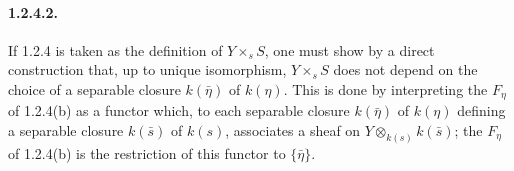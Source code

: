 \paragraph{1.2.4.2.}
If 1.2.4 is taken as the definition of $Y\times_sS$, one must show by
a direct construction that, up to unique isomorphism, $Y\times_sS$
does not depend on the choice of a separable closure $k(\bar\eta)$ of
$k(\eta)$.  This is done by interpreting the $F_\eta$ of 1.2.4(b) as
a functor which, to each separable closure $k(\bar\eta)$ of $k(\eta)$
defining a separable closure $k(\bar s)$ of $k(s)$, associates a sheaf
on $Y\otimes_{k(s)}k(\bar s)$; the $F_\eta$ of 1.2.4(b) is the
restriction of this functor to $\{\bar\eta\}$.

